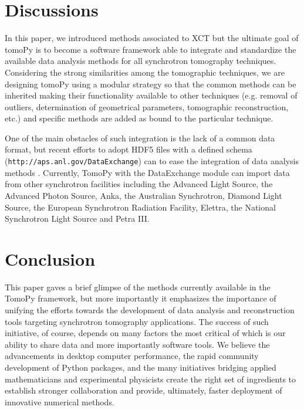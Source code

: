 \documentclass[pdf]{iucr}              %
\begin{document}


\section{Discussions}

In this paper, we introduced methods associated to XCT but the ultimate goal of tomoPy is to become a software framework able to integrate and standardize the available data analysis methods for all synchrotron tomography techniques. Considering the strong similarities among the tomographic techniques, we are designing tomoPy using a modular strategy so that the common methods can be inherited making their functionality available to other techniques (e.g. removal of outliers, determination of geometrical parameters, tomographic reconstruction, etc.) and specific methods are added as bound to the particular technique. 

One of the main obstacles of such integration is the lack of a common data format, but recent efforts to adopt HDF5 files with a defined schema (\texttt{http://aps.anl.gov/DataExchange}) can to ease the integration of data analysis methods \cite{Francesco2014}. Currently, TomoPy with the DataExchange module can import data from other synchrotron facilities including the Advanced Light Source, the Advanced Photon Source, Anka, the Australian Synchrotron, Diamond Light Source, the European Synchrotron Radiation Facility, Elettra, the National Synchrotron Light Source and Petra III. 

\section{Conclusion}

This paper gaves a brief glimpse of the methods currently available in the TomoPy framework, but more importantly it emphasizes the importance of unifying the efforts towards the development of data analysis and reconstruction tools targeting synchrotron tomography applications. The success of such initiative, of course, depends on many factors the most critical of which is our ability to share data and more importantly software tools. We believe the advancements in desktop computer performance, the rapid community development of Python packages, and the many initiatives bridging applied mathematicians and experimental physicists create the right set of ingredients to establish stronger collaboration and provide, ultimately, faster deployment of innovative numerical methods.
\end{document}
